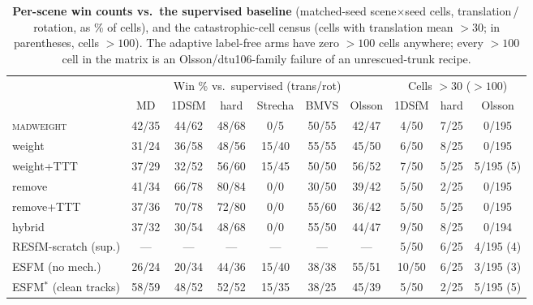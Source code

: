 \documentclass[10pt,twocolumn,letterpaper]{article}
\newcommand{\mad}{\textsc{madweight}}
\begin{document}
\begin{table}[h]\centering\scriptsize
\setlength{\tabcolsep}{3.5pt}
\caption{\textbf{Per-scene win counts vs.\ the supervised baseline} (matched-seed
scene$\times$seed cells, translation\,/\,rotation, as \% of cells), and the
catastrophic-cell census (cells with translation mean $>30$; in parentheses, cells
$>100$). The adaptive label-free arms have zero $>100$ cells anywhere; every $>100$
cell in the matrix is an Olsson/dtu106-family failure of an unrescued-trunk recipe.}
\label{tab:wincount}
\begin{tabular}{@{}lcccccc|ccc@{}}
\toprule
 & \multicolumn{6}{c|}{Win \% vs.\ supervised (trans/rot)} & \multicolumn{3}{c}{Cells $>30$ ($>100$)}\\
 & MD & 1DSfM & hard & Strecha & BMVS & Olsson & 1DSfM & hard & Olsson\\
\midrule
\mad{}       & 42/35 & 44/62 & 48/68 & 0/5   & 50/55 & 42/47 & 4/50 & 7/25 & 0/195\\
weight       & 31/24 & 36/58 & 48/56 & 15/40 & 55/55 & 45/50 & 6/50 & 8/25 & 0/195\\
weight+TTT   & 37/29 & 32/52 & 56/60 & 15/45 & 50/50 & 56/52 & 7/50 & 5/25 & 5/195 (5)\\
remove       & 41/34 & 66/78 & 80/84 & 0/0   & 30/50 & 39/42 & 5/50 & 2/25 & 0/195\\
remove+TTT   & 37/36 & 70/78 & 72/80 & 0/0   & 55/60 & 36/42 & 5/50 & 5/25 & 0/195\\
hybrid       & 37/32 & 30/54 & 48/68 & 0/0   & 55/50 & 44/47 & 9/50 & 8/25 & 0/194\\
RESfM-scratch (sup.) & --- & --- & --- & --- & --- & --- & 5/50 & 6/25 & 4/195 (4)\\
ESFM (no mech.) & 26/24 & 20/34 & 44/36 & 15/40 & 38/38 & 55/51 & 10/50 & 6/25 & 3/195 (3)\\
ESFM$^{\ast}$ (clean tracks) & 58/59 & 48/52 & 52/52 & 15/35 & 38/25 & 45/39 & 5/50 & 2/25 & 5/195 (5)\\
\bottomrule
\end{tabular}
\end{table}
\end{document}
